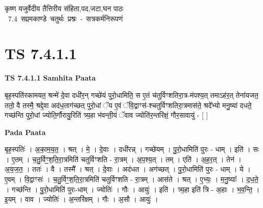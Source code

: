 \documentclass[17pt]{extarticle}
\begin{document}
\begin{titlepage}
    \begin{center}
 
\begin{sanskrit}
    { \Huge
    कृष्ण यजुर्वेदीय तैत्तिरीय संहिता,पद,जटा,घन पाठः 
    }
    \\
    \vspace{2.5cm}
    \mbox{ \Huge
    7.4      सप्तमकाण्डे चतुर्थः प्रश्नः - सत्रकर्मनिरूपणं   }
\end{sanskrit}
\end{center}

\end{titlepage}
\tableofcontents
\pagebreak

\section*{ TS 7.4.1.1 }

\textbf{TS 7.4.1.1 } \newline
\textbf{Samhita Paata} \newline

बृह॒स्पति॑रकामयत॒ श्रन्मे॑ दे॒वा दधी॑र॒न् गच्छे॑यं पुरो॒धामिति॒ स ए॒तं च॑तुर्विꣳशतिरा॒त्र-म॑पश्य॒त् तमाऽह॑र॒त् तेना॑यजत॒ ततो॒ वै तस्मै॒ श्रद्दे॒वा अद॑ध॒ताग॑च्छत् पुरो॒धां ॅय ए॒वं ॅवि॒द्वाꣳस॑-श्चतुर्विꣳशतिरा॒त्रमास॑ते॒ श्रदे᳚भ्यो मनु॒ष्या॑ दधते॒ गच्छ॑न्ति पुरो॒धां ज्योति॒र्गौरायु॒रिति॑ त्र्य॒हा भ॑वन्ती॒यं ॅवाव ज्योति॑र॒न्तरि॑क्षं॒ गौर॒सावायु॑ - [  ] \newline

\textbf{Pada Paata} \newline

बृह॒स्पतिः॑ । अ॒का॒म॒य॒त॒ । श्रत् । मे॒ । दे॒वाः । दधी॑रन्न् । गच्छे॑यम् । पु॒रो॒धामिति॑ पुरः - धाम् । इति॑ । सः । ए॒तम् । च॒तु॒र्विꣳ॒॒श॒ति॒रा॒त्रमिति॑ चतुर्विꣳशति - रा॒त्रम् । अ॒प॒श्य॒त् । तम् । एति॑ । अ॒ह॒र॒त् । तेन॑ । अ॒य॒ज॒त॒ । ततः॑ । वै । तस्मै᳚ । श्रत् । दे॒वाः । अद॑धत । अग॑च्छत् । पु॒रो॒धामिति॑ पुरः - धाम् । ये । ए॒वम् । वि॒द्वाꣳसः॑ । च॒तु॒र्विꣳ॒॒श॒ति॒रा॒त्रमिति॑ चतुर्विꣳशति - रा॒त्रम् । आस॑ते । श्रत् । ए॒भ्यः॒ । म॒नु॒ष्याः᳚ । द॒ध॒ते॒ । गच्छ॑न्ति । पु॒रो॒धामिति॑ पुरः-धाम् । ज्योतिः॑ । गौः । आयुः॑ । इति॑ । त्र्य॒हा इति॑ त्रि - अ॒हाः । भ॒व॒न्ति॒ । इ॒यम् । वाव । ज्योतिः॑ । अ॒न्तरि॑क्षम् । गौः । अ॒सौ । आयुः॑ ।  \newline




\end{document}

